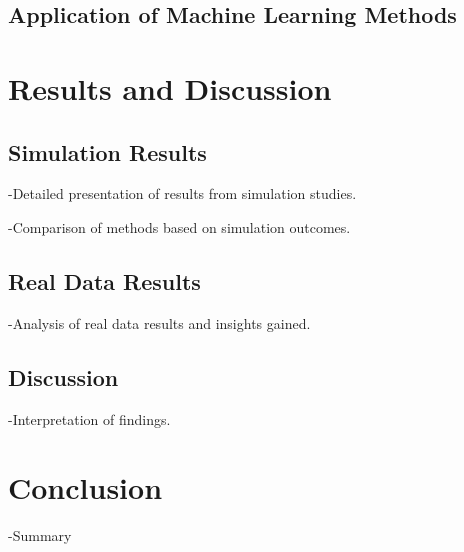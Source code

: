 \documentclass{article}
\begin{document}
\subsection{Application of Machine Learning Methods}

\section{Results and Discussion}
\subsection{Simulation Results}
-Detailed presentation of results from simulation studies.

-Comparison of methods based on simulation outcomes.

\subsection{Real Data Results}
-Analysis of real data results and insights gained.

\subsection{Discussion}
-Interpretation of findings.

\section{Conclusion}
-Summary

\newpage
{}



\newpage
\appendix
\end{document}
